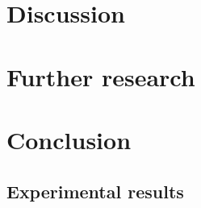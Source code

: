 \documentclass[a4paper,12pt,titlepage,twoside,openany]{book}
\begin{document}
\chapter{Discussion}
\label{ch:discussion}


\chapter{Further research}
\label{ch:further}


\chapter{Conclusion}
\label{ch:conclusion}


\begingroup
    \setlength{\bibsep}{4pt}
    \singlespacing
    
\endgroup

\begin{appendices}


    \chapter{Experimental results}
    \label{ch:results_tables}
    

\end{appendices}

\resetpath

\cleardoublepage


\cleardoublepage
\begin{titlepage}

\end{titlepage}

\cleardoublepage
\begin{titlepage}

\end{titlepage}
\end{document}
